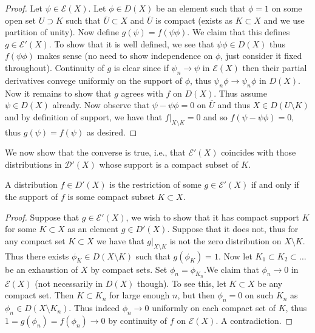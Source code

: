 \documentclass[twoside, a4paper, 10pt]{amsart}
\begin{document}
\begin{proof} Let $\psi \in \mathcal{E}(X)$. Let $\phi \in D(X)$ be an element such that $\phi = 1$ on some open set $U \supset K$ such that $\overline{U} \subset X$ and $\overline{U}$ is compact (exists as $K \subset X$ and we use partition of unity). Now define $g(\psi) = f(\psi \phi)$. We claim that this defines $g \in \mathcal{E}'(X)$. To show that it is well defined, we see that $\psi \phi \in D(X)$ thus $f(\psi \phi)$ makes sense (no need to show independence on $\phi$, just consider it fixed throughout). Continuity of $g$ is clear since if $\psi_n \to \psi$ in $\mathcal{E}(X)$ then their partial derivatives convege uniformly on the support of $\phi$, thus $\psi_n\phi \to \psi_n \phi$ in $D(X)$. Now it remains to show that $g$ agrees with $f$ on $D(X)$. Thus assume $\psi \in D(X)$ already. Now observe that $\psi - \psi\phi = 0$ on $\overline{U}$ and thus $X \in D(U \setminus K)$  and by definition of support, we have that $f|_{X \setminus K} = 0$ and so $f(\psi - \psi \phi) = 0$, thus $g(\psi) = f(\psi)$ as desired.\end{proof}

We now show that the converse is true, i.e., that $\mathcal{E}'(X)$ coincides with those distributions in $\mathcal{D}'(X)$ whose support is a compact subset of $K$.

\begin{thm} A distribution $f \in D'(X)$ is the restriction of some $g \in \mathcal{E}'(X)$ if and only if the support of $f$ is some compact subset $K \subset X$. 

\end{thm}

\begin{proof} Suppose that $g \in \mathcal{E}'(X)$, we wish to show that it has compact support $K$ for some $K \subset X$ as an element $g \in D'(X)$. Suppose that it does not, thus for any compact set $K \subset X$ we have that $g|_{X \setminus K}$ is not the zero distribution on $X \setminus K$. Thus there exists $\phi_K \in D(X \setminus K)$ such that $g(\phi_K) = 1$. Now let $K_1 \subset K_2 \subset \ldots $ be an exhaustion of $X$ by compact sets. Set $\phi_{n} = \phi_{K_n}$.We claim that $\phi_n \to 0$ in $\mathcal{E}(X)$ (not necessarily in $D(X)$ though). To see this, let $K \subset X$ be any compact set. Then $K \subset K_n$ for large enough $n$, but then $\phi_n = 0$ on such $K_n$ as $\phi_n \in D(X \setminus K_n)$. Thus indeed $\phi_n \to 0$ uniformly on each compact set of $K$, thus $1 = g(\phi_n) = f(\phi_n) \to 0$ by continuity of $f$ on $\mathcal{E}(X)$. A contradiction. \end{proof}
\end{document}
